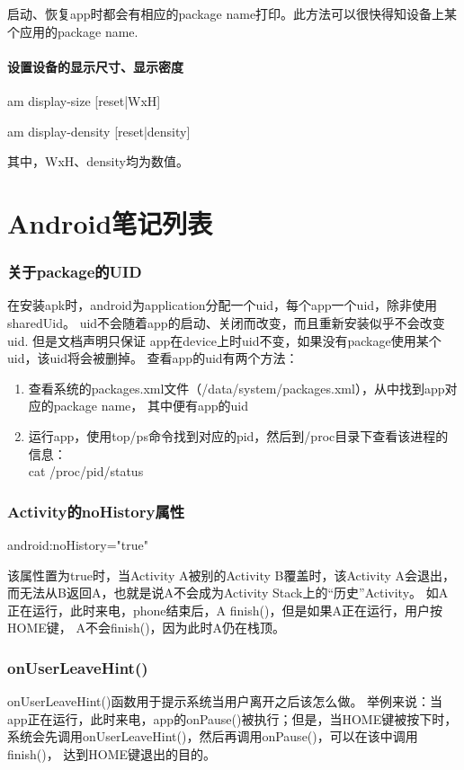 ﻿\documentclass[a4paper,11pt]{article}
\begin{document}
  启动、恢复app时都会有相应的package name打印。此方法可以很快得知设备上某个应用的package name.

  \subsection[设置设备的显示尺寸、显示密度]{设置设备的显示尺寸、显示密度}
  am display-size [reset|WxH]

  am display-density [reset|density]

  其中，WxH、density均为数值。

  \part[Android Notes List]{Android笔记列表}
  \section[关于package的UID]{关于package的UID}
  在安装apk时，android为application分配一个uid，每个app一个uid，除非使用sharedUid。
	uid不会随着app的启动、关闭而改变，而且重新安装似乎不会改变uid. 但是文档声明只保证
	app在device上时uid不变，如果没有package使用某个uid，该uid将会被删掉。
	查看app的uid有两个方法：
  \begin{enumerate}
    \item 查看系统的packages.xml文件（/data/system/packages.xml），从中找到app对应的package name，
		      其中便有app的uid
    \item 运行app，使用top/ps命令找到对应的pid，然后到/proc目录下查看该进程的信息：\\
      		cat /proc/\lt pid\gt/status
  \end{enumerate}

  \section[Activity的noHistory属性]{Activity的noHistory属性}
  android:noHistory="true"

  该属性置为true时，当Activity A被别的Activity B覆盖时，该Activity A会退出，
  而无法从B返回A，也就是说A不会成为Activity Stack上的“历史”Activity。
  如A正在运行，此时来电，phone结束后，A finish()，但是如果A正在运行，用户按HOME键，
  A不会finish()，因为此时A仍在栈顶。

  \section[onUserLeaveHint()]{onUserLeaveHint()}
  onUserLeaveHint()函数用于提示系统当用户离开之后该怎么做。
  举例来说：当app正在运行，此时来电，app的onPause()被执行；但是，当HOME键被按下时，
  系统会先调用onUserLeaveHint()，然后再调用onPause()，可以在该中调用finish()，
  达到HOME键退出的目的。
\end{document}
